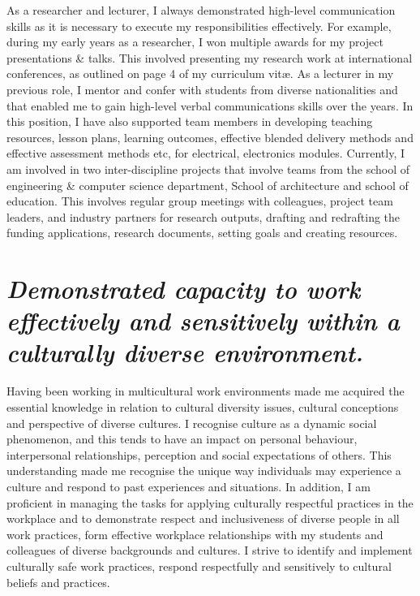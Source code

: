 \documentclass{article}
\begin{document}
As a researcher and lecturer, I always demonstrated high-level communication skills as it is necessary to execute my responsibilities effectively. For example, during my early years as a researcher, I won multiple awards for my project presentations \& talks. This involved presenting my research work at international conferences, as outlined on page 4 of my curriculum vitæ. As a lecturer in my previous role, I mentor and confer with students from diverse nationalities and that enabled me to gain high-level verbal communications skills over the years.  In this position, I have also supported team members in developing teaching resources, lesson plans, learning outcomes, effective blended delivery methods and effective assessment methods etc, for electrical, electronics modules. Currently, I am involved in two inter-discipline projects that involve teams from the school of engineering & computer science department, School of architecture and school of education. This involves regular group meetings with colleagues, project team leaders, and industry partners for research outputs, drafting and redrafting the funding applications, research documents, setting goals and creating resources.  

\section{\textit{\fontsize{12}{12}\selectfont Demonstrated capacity to work effectively and sensitively within a culturally diverse environment.}}

Having been working in multicultural work environments made me acquired the essential knowledge in relation to cultural diversity issues, cultural conceptions and perspective of diverse cultures. I recognise culture as a dynamic social phenomenon, and this tends to have an impact on personal behaviour, interpersonal relationships, perception and social expectations of others. This understanding made me recognise the unique way individuals may experience a culture and respond to past experiences and situations. In addition, I am proficient in managing the tasks for applying culturally respectful practices in the workplace and to demonstrate respect and inclusiveness of diverse people in all work practices, form effective workplace relationships with my students and colleagues of diverse backgrounds and cultures. I strive to identify and implement culturally safe work practices, respond respectfully and sensitively to cultural beliefs and practices.
\end{document}
